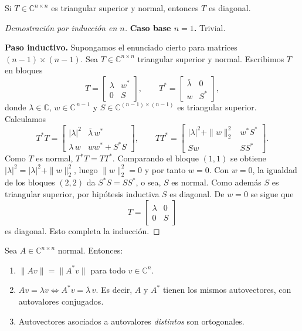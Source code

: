 \medskip
\begin{lema}\label{lema:triangular-normal}
Si \(T\in\mathbb{C}^{n\times n}\) es triangular superior y normal, entonces \(T\) es diagonal.
\end{lema}

\begin{proof}[Demostración por inducción en $n$]
\textbf{Caso base $n=1$.} Trivial.

\medskip
\textbf{Paso inductivo.} Supongamos el enunciado cierto para matrices
$(n-1)\times(n-1)$. Sea $T\in\mathbb{C}^{n\times n}$ triangular superior y normal.
Escribimos $T$ en bloques
\[
T=\begin{bmatrix}
\lambda & w^{*}\\
0 & S
\end{bmatrix},
\qquad
T^{*}=\begin{bmatrix}
\overline{\lambda} & 0\\
w & S^{*}
\end{bmatrix},
\]
donde $\lambda\in\mathbb{C}$, $w\in\mathbb{C}^{\,n-1}$ y $S\in\mathbb{C}^{(n-1)\times(n-1)}$
es triangular superior. Calculamos
\[
T^{*}T=
\begin{bmatrix}
|\lambda|^{2} & \overline{\lambda}\,w^{*}\\[2pt]
\lambda\,w & ww^{*}+S^{*}S
\end{bmatrix},
\qquad
TT^{*}=
\begin{bmatrix}
|\lambda|^{2}+\|w\|_{2}^{2} & w^{*}S^{*}\\[2pt]
Sw & SS^{*}
\end{bmatrix}.
\]
Como $T$ es normal, $T^{*}T=TT^{*}$. Comparando el bloque $(1,1)$ se obtiene
$|\lambda|^{2}=|\lambda|^{2}+\|w\|_{2}^{2}$, luego $\|w\|_{2}^{2}=0$ y por tanto $w=0$.
Con $w=0$, la igualdad de los bloques $(2,2)$ da $S^{*}S=SS^{*}$, o sea,
$S$ es normal. Como además $S$ es triangular superior, por hipótesis inductiva
$S$ es diagonal. De $w=0$ se sigue que
\[
T=\begin{bmatrix}\lambda&0\\[2pt]0&S\end{bmatrix}
\]
es diagonal. Esto completa la inducción.
\end{proof}

\begin{lema}\label{lema:normal-basico}  %
Sea $A\in\mathbb{C}^{n\times n}$ normal. Entonces:
\begin{enumerate}[label=(\roman*)]
\item $\|Av\|=\|A^{*}v\|$ para todo $v\in\mathbb{C}^{n}$.
\item $Av=\lambda v \iff A^{*}v=\overline{\lambda}\,v$. Es decir, $A$ y $A^{*}$ tienen
      los mismos autovectores, con autovalores conjugados.
\item Autovectores asociados a autovalores \emph{distintos} son ortogonales.
\end{enumerate}
\end{lema}

